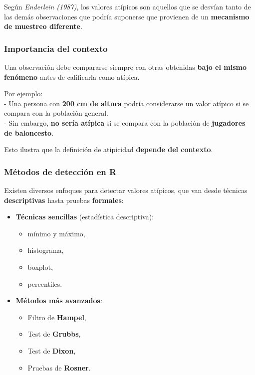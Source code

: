 \documentclass[
]{book}
\providecommand{\tightlist}{%
  \setlength{\itemsep}{0pt}\setlength{\parskip}{0pt}}
\begin{document}
Según \emph{Enderlein (1987)}, los valores atípicos son aquellos que se desvían tanto de las demás observaciones que podría suponerse que provienen de un \textbf{mecanismo de muestreo diferente}.

\subsubsection{Importancia del contexto}\label{importancia-del-contexto}

Una observación debe compararse siempre con otras obtenidas \textbf{bajo el mismo fenómeno} antes de calificarla como atípica.

Por ejemplo:\\
- Una persona con \textbf{200 cm de altura} podría considerarse un valor atípico si se compara con la población general.\\
- Sin embargo, \textbf{no sería atípica} si se compara con la población de \textbf{jugadores de baloncesto}.

Esto ilustra que la definición de atipicidad \textbf{depende del contexto}.

\subsubsection{Métodos de detección en R}\label{muxe9todos-de-detecciuxf3n-en-r}

Existen diversos enfoques para detectar valores atípicos, que van desde técnicas \textbf{descriptivas} hasta pruebas \textbf{formales}:

\begin{itemize}
\tightlist
\item
  \textbf{Técnicas sencillas} (estadística descriptiva):

  \begin{itemize}
  \tightlist
  \item
    mínimo y máximo,\\
  \item
    histograma,\\
  \item
    boxplot,\\
  \item
    percentiles.
  \end{itemize}
\item
  \textbf{Métodos más avanzados}:

  \begin{itemize}
  \tightlist
  \item
    Filtro de \textbf{Hampel},\\
  \item
    Test de \textbf{Grubbs},\\
  \item
    Test de \textbf{Dixon},\\
  \item
    Pruebas de \textbf{Rosner}.
  \end{itemize}
\end{itemize}
\end{document}
